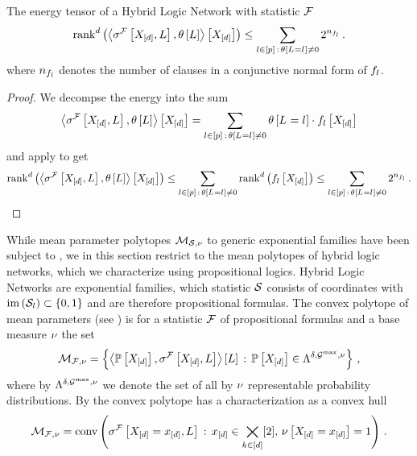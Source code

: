 \begin{corollary}
    The energy tensor of a Hybrid Logic Network with statistic $\mathcal{F}$
    \begin{align*}
        \mathrm{rank}^{d}\left(\left\langle \sigma^{\mathcal{F}}\left[X_{[d]},L\right],\theta\left[L\right]\right\rangle \left[ X_{[d]} \right]\right) \leq \sum_{l\in[p]\,:\,\theta\left[L_{}=l_{}\right]\neq0} 2^{n_{f_{l}}} \, .
    \end{align*}
    where $n_{f_{l}}$ denotes the number of clauses in a conjunctive normal form of $f_{l}$.
\end{corollary}
\begin{proof}
    We decompse the energy into the sum
    \begin{align*}
        \left\langle \sigma^{\mathcal{F}}\left[X_{[d]},L\right],\theta\left[L\right]\right\rangle \left[ X_{[d]} \right]
        = \sum_{l\in[p]\,:\,\theta\left[L_{}=l_{}\right]\neq0} \theta\left[L_{}=l_{}\right] \cdot f_{l}\left[X_{[d]}\right]
    \end{align*}
    and apply  to get
    \begin{align*}
        \mathrm{rank}^{d}\left(\left\langle \sigma^{\mathcal{F}}\left[X_{[d]},L\right],\theta\left[L\right]\right\rangle \left[ X_{[d]} \right]\right)
        \leq \sum_{l\in[p]\,:\,\theta\left[L_{}=l_{}\right]\neq0} \mathrm{rank}^{d}\left(f_{l}\left[X_{[d]}\right]\right)
        \leq \sum_{l\in[p]\,:\,\theta\left[L_{}=l_{}\right]\neq0}2^{n_{f_{l}}} \, .
    \end{align*}
\end{proof}



While mean parameter polytopes $\mathcal{M}_{\mathcal{S},\nu}$ to generic exponential families have been subject to , we in this section restrict to the mean polytopes of hybrid logic networks, which we characterize using propositional logics.
Hybrid Logic Networks are exponential families, which statistic $\mathcal{S}$ consists of coordinates with $\mathrm{im}\left(\mathcal{S}_{l}\right)\subset\{0,1\}$ and are therefore propositional formulas.
The convex polytope of mean parameters (see ) is for a statistic $\mathcal{F}$ of propositional formulas and a base measure $\nu$ the set
\begin{align*}
    \mathcal{M}_{\mathcal{F},\nu} = \left\{ \left\langle \mathbb{P}\left[X_{[d]}\right],\sigma^{\mathcal{F}}\left[X_{[d]},L\right]\right\rangle \left[ L \right] \,:\, \mathbb{P}\left[X_{[d]}\right]\in\Lambda^{\delta,\mathcal{G}^{\mathrm{max}},\nu} \right\} \, ,
\end{align*}
where by $\Lambda^{\delta,\mathcal{G}^{\mathrm{max}},\nu}$ we denote the set of all by $\nu$ representable probability distributions.
By  the convex polytope has a characterization as a convex hull
\begin{align}
    \label{eq:hlnMeansetConvCharacterization}
    \mathcal{M}_{\mathcal{F},\nu}
    = \mathrm{conv}\left(\sigma^{\mathcal{F}}\left[X_{[d]}=x_{[d]},L\right] \,:\, x_{[d]}\in\bigtimes_{k\in[d]}[2], \, \nu\left[X_{[d]}=x_{[d]}\right]=1\right) \, .
\end{align}

